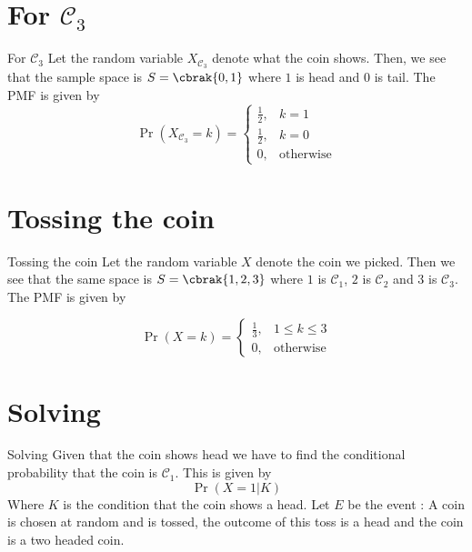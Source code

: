\documentclass{beamer}
\providecommand{\pr}[1]{\ensuremath{\Pr\left(#1\right)}}
\begin{document}
\section{For $\mathcal{C}_3$}
\begin{frame}{For $\mathcal{C}_3$}
Let the random variable $X_{\mathcal{C}_3}$ denote what the coin shows. Then, we see that the sample space is $S = \cbrak{0, 1}$ where $1$ is head and $0$ is tail. The PMF is given by
\begin{equation}
\pr{X_{\mathcal{C}_3} = k} = 
\begin{cases}
\frac{1}{2}, & k = 1 \\
\frac{1}{2}, & k = 0 \\
0, & \text{otherwise}
\end{cases}
\label{pmf}
\end{equation}
\end{frame} 

\section{Tossing the coin}
\begin{frame} {Tossing the coin}
Let the random variable $X$ denote the coin we picked. Then we see that the same space is $S = \cbrak{1,2,3}$ where $1$ is $\mathcal{C}_1$, $2$ is $\mathcal{C}_2$ and $3$ is $\mathcal{C}_3$. The PMF is given by
 
\begin{equation}
\pr{X = k} = 
\begin{cases}
\frac{1}{3}, & 1 \leq k \leq 3 \\
0, & \text{otherwise}
\end{cases}
\label{pmf}
\end{equation}
\end{frame}

\section{Solving}
\begin{frame}{Solving}
    Given that the coin shows head we have to find the conditional probability that the coin is $\mathcal{C}_1$. This is given by
\begin{equation}
    \pr{X = 1 | K}
\end{equation}
Where $K$ is the condition that the coin shows a head.\newline 
Let $E$ be the event : A coin is chosen at random and is tossed, the outcome of this toss is a head and the coin is a two headed coin.
\end{frame}
\end{document}
